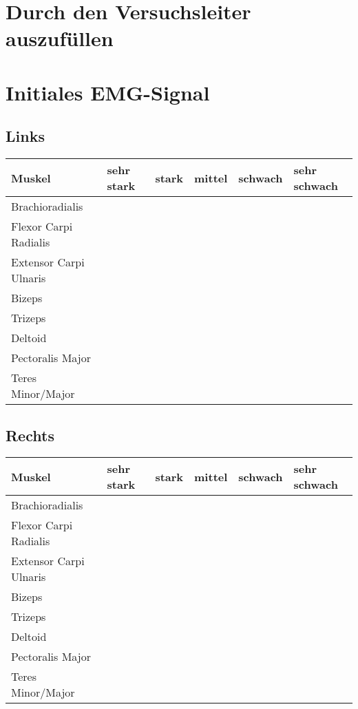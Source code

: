 \documentclass{article}
\begin{document}
\section*{Durch den Versuchsleiter auszuf\"ullen}
\section{Initiales EMG-Signal}
\subsection{Links}
\begin{center}
  \begin{tabular}{ |p{} |  p{} | p{} | p{} | p{} | p{} |  }
    \hline
    Muskel & sehr stark & stark & mittel & schwach & sehr schwach \\ \hline
    Brachioradialis  & & & & &\\ \hline
    Flexor Carpi Radialis  & & & & &\\ \hline
    Extensor Carpi Ulnaris  & & & & &\\ \hline
    Bizeps & & & & &\\ \hline
    Trizeps & & & & &\\ \hline
    Deltoid & & & & &\\ \hline
    Pectoralis Major & & & & &\\ \hline
    Teres Minor/Major & & & & &\\ \hline 
  \end{tabular}
\end{center}

\subsection{Rechts}
\begin{center}
  \begin{tabular}{ |p{} |  p{} | p{} | p{} | p{} | p{} |  }
    \hline
    Muskel & sehr stark & stark & mittel & schwach & sehr schwach \\ \hline
    Brachioradialis  & & & & &\\ \hline
    Flexor Carpi Radialis  & & & & &\\ \hline
    Extensor Carpi Ulnaris  & & & & &\\ \hline
    Bizeps & & & & &\\ \hline
    Trizeps & & & & &\\ \hline
    Deltoid & & & & &\\ \hline
    Pectoralis Major & & & & &\\ \hline
    Teres Minor/Major & & & & &\\ \hline 
  \end{tabular}
\end{center}
\end{document}
